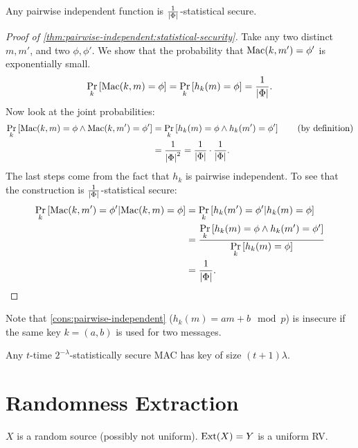 \begin{theorem} \label{thm:pairwise-independent:statistical-security}
	Any pairwise independent function is $\frac{1}{\abs{\GenericAuthSpace}}$-statistical secure.
\end{theorem}

\begin{proof}[Proof of \cref{thm:pairwise-independent:statistical-security}]
	Take any two distinct $m, m'$, and two $\phi, \phi'$.
	We show that the probability that $\GenericMac(k,m') = \phi'$ is exponentially small.
	\begin{equation*}
		\Pr[k]{\GenericMac(k,m) = \phi} =
		\Pr[k]{h_k(m) = \phi} =
		\frac{1}{\abs{\GenericAuthSpace}}.
	\end{equation*}
	Now look at the joint probabilities:
	\begin{align*}
		\Pr[k]{\GenericMac(k,m) = \phi \land \GenericMac(k,m') = \phi'} 
		& = 
		\Pr[k]{h_k(m) = \phi \land h_k(m') = \phi'} 
		\tag{by definition}
		\\
		& =
		\frac{1}{\abs{\GenericAuthSpace}^2}
		=
		\frac{1}{\abs{\GenericAuthSpace}}
		\cdot
		\frac{1}{\abs{\GenericAuthSpace}}.
	\end{align*}
	The last steps come from the fact that $h_k$ is pairwise independent.
	To see that the construction is $\frac{1}{\abs{\GenericAuthSpace}}$-statistical secure:
	\begin{align*}
		\Pr[k]{\GenericMac(k, m') = \phi' | \GenericMac(k,m) = \phi}
		& =
		\Pr[k]{h_k(m') = \phi' | h_k(m) = \phi}
		\\
		& =
		\frac{\Pr[k]{h_k(m) = \phi \land h_k(m') = \phi'}}{\Pr[k]{h_k(m) = \phi}}
		\\
		& =
		\frac{1}{\abs{\GenericAuthSpace}}.
	\end{align*}
\end{proof}

Note that \cref{cons:pairwise-independent} ($h_k(m) = a m + b \mod p$) is insecure if the same key $k = (a,b)$ is used for two messages.

\begin{theorem}
	Any $t$-time $2^{-\lambda}$-statistically secure \ac{MAC} has key of size $(t+1)\lambda$.
\end{theorem}

\section{Randomness Extraction}

$X$ is a random source (possibly not uniform).
$\Ext(X) = Y$ is a uniform \ac{RV}.


